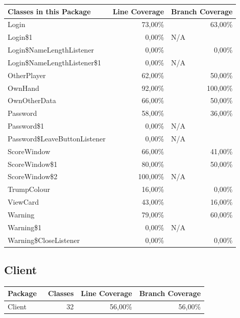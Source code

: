 \documentclass[a4paper]{article}
\begin{document}
\noindent
\begin{tabular}{|l|r|l|}
\hline
Classes in this Package & \multicolumn{1}{l|}{Line Coverage} & Branch Coverage \\ \hline
Login & 73,00\% & \multicolumn{1}{r|}{63,00\%} \\ \hline
Login\$1 & 0,00\% & N/A \\ \hline
Login\$NameLengthListener & 0,00\% & \multicolumn{1}{r|}{0,00\%} \\ \hline
Login\$NameLengthListener\$1 & 0,00\% & N/A \\ \hline
OtherPlayer & 62,00\% & \multicolumn{1}{r|}{50,00\%} \\ \hline
OwnHand & 92,00\% & \multicolumn{1}{r|}{100,00\%} \\ \hline
OwnOtherData & 66,00\% & \multicolumn{1}{r|}{50,00\%} \\ \hline
Password & 58,00\% & \multicolumn{1}{r|}{36,00\%} \\ \hline
Password\$1 & 0,00\% & N/A \\ \hline
Password\$LeaveButtonListener & 0,00\% & N/A \\ \hline
ScoreWindow & 66,00\% & \multicolumn{1}{r|}{41,00\%} \\ \hline
ScoreWindow\$1 & 80,00\% & \multicolumn{1}{r|}{50,00\%} \\ \hline
ScoreWindow\$2 & 100,00\% & N/A \\ \hline
TrumpColour & 16,00\% & \multicolumn{1}{r|}{0,00\%} \\ \hline
ViewCard & 43,00\% & \multicolumn{1}{r|}{16,00\%} \\ \hline
Warning & 79,00\% & \multicolumn{1}{r|}{60,00\%} \\ \hline
Warning\$1 & 0,00\% & N/A \\ \hline
Warning\$CloseListener & 0,00\% & \multicolumn{1}{r|}{0,00\%} \\ \hline
\end{tabular}

	
	\subsection{Client}
	
	\noindent
	\begin{tabular}{|l|l|l|l|} \hline
	Package & \ Classes & Line Coverage & Branch Coverage \\ \hline \hline
	Client & \multicolumn{1}{r|}{32} & \multicolumn{1}{r|}{56,00\%} & \multicolumn{1}{r|}{56,00\%} \\ \hline
	\end{tabular}
\end{document}

